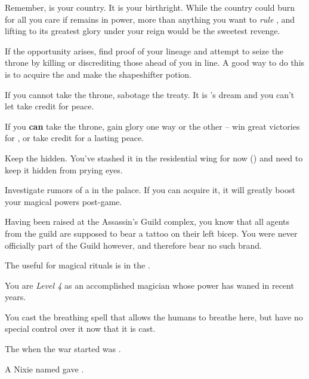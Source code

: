 \documentclass[char]{NeptuneBall}
\begin{document}
Remember, \pAtlantis{} is your country. It is your birthright. While the country could burn for all you care if \cKing{} remains in power, more than anything you want to \emph{rule} \pAtlantis{}, and lifting \pAtlantis{} to its greatest glory under your reign would be the sweetest revenge.

\begin{itemz}[Goals]
  \item If the opportunity arises, find proof of your lineage and attempt to seize the throne by killing or discrediting those ahead of you in line. A good way to do this is to acquire the \iHemlock{} and make the shapeshifter potion.
  \item If you cannot take the throne, sabotage the treaty. It is \cKing{}'s dream and you can't let \cKing{\them} take credit for peace.
	\item If you {\bf can} take the throne, gain glory one way or the other -- win great victories for \pAtlantis{}, or take credit for a lasting peace.
  \item Keep the \iMusicBox{} hidden. You've stashed it in the residential wing for now (\sPacketA{\MYloc}) and need to keep it hidden from prying eyes.
  \item Investigate rumors of a \iGlowShell{} in the palace. If you can acquire it, it will greatly boost your magical powers post-game.
\end{itemz}

\begin{itemz}[Notes]
  \item Having been raised at the Assassin's Guild complex, you know that all agents from the guild are supposed to bear a tattoo on their left bicep. You were never officially part of the Guild however, and therefore bear no such brand.
	\item The \sRunicCircle{} useful for magical rituals is in the \pCaves{\MYname}.
	\item You are \emph{Level 4} as an accomplished magician whose power has waned in recent years.
  \item You cast the breathing spell that allows the humans to breathe here, but have no special control over it now that it is cast.
\end{itemz}

\begin{itemz}[Trivia]
  \item The \cExExKing{\King} when the war started was \cExExKing{}.
	\item A Nixie named \cNixie{} gave \cExKing{} \iTrident{\MYname}.
\end{itemz}
\end{document}
